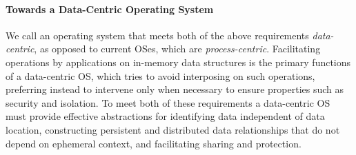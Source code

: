 \begin{chconc}
    \paragraph{Towards a Data-Centric Operating System}
    We call an operating system that meets both of the above requirements
    \emph{data-centric}, as opposed to current OSes, which are \emph{process-centric}.
    Facilitating
    operations by applications on in-memory data structures is the primary functions of a data-centric OS,
    which tries to avoid interposing on such operations, preferring instead to intervene only when
    necessary to ensure properties such as security and isolation. To meet both of these requirements
    a data-centric OS must provide effective abstractions for identifying data independent
    of data location, constructing persistent and distributed data relationships that do not depend on ephemeral
    context, and facilitating sharing and protection.












\end{chconc}

